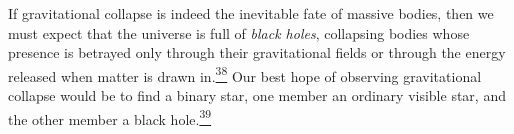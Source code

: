 If gravitational collapse is indeed the inevitable fate of massive bodies,
then we must expect that the universe is full of \emph{black holes},
collapsing bodies whose presence is betrayed only through their gravitational
fields or through the energy released when matter is drawn
in.\hyperref[ch11-ref-38]{\textsuperscript{38}} Our best hope of observing
gravitational collapse would be to find a binary star, one member an ordinary
visible star, and the other member a black
hole.\hyperref[ch11-ref-39]{\textsuperscript{39}}
